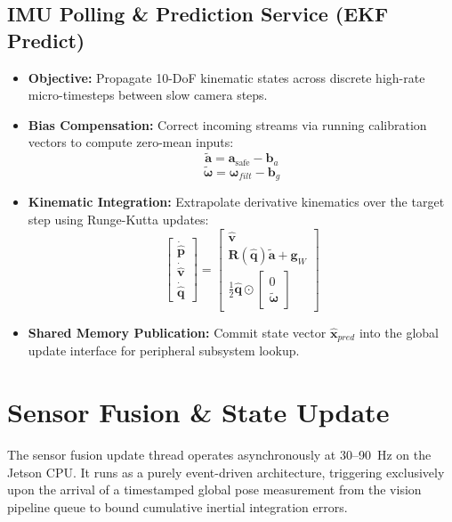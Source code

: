 \documentclass{article}
\begin{document}
\subsection{IMU Polling \& Prediction Service (EKF Predict)}
\begin{itemize}
    \item \textbf{Objective:} Propagate 10-DoF kinematic states across discrete high-rate micro-timesteps between slow camera steps.
    \item \textbf{Bias Compensation:} Correct incoming streams via running calibration vectors to compute zero-mean inputs:
    $$\tilde{\mathbf{a}} = \mathbf{a}_{\text{safe}} - \mathbf{b}_a$$
    $$\tilde{\boldsymbol{\omega}} = \boldsymbol{\omega}_{filt} - \mathbf{b}_g$$
    \item \textbf{Kinematic Integration:} Extrapolate derivative kinematics over the target step using Runge-Kutta updates:
    $$\begin{bmatrix} \dot{\hat{\mathbf{p}}} \\ \dot{\hat{\mathbf{v}}} \\ \dot{\hat{\mathbf{q}}} \end{bmatrix} = \begin{bmatrix} \hat{\mathbf{v}} \\ \mathbf{R}(\hat{\mathbf{q}})\tilde{\mathbf{a}} + \mathbf{g}_W \\ \frac{1}{2} \hat{\mathbf{q}} \odot \begin{bmatrix} 0 \\ \tilde{\boldsymbol{\omega}} \end{bmatrix} \end{bmatrix}$$
    \item \textbf{Shared Memory Publication:} Commit state vector $\hat{\mathbf{x}}_{pred}$ into the global update interface for peripheral subsystem lookup.
\end{itemize}


\section{Sensor Fusion \& State Update}
The sensor fusion update thread operates asynchronously at 30--90~Hz on the Jetson CPU. It runs as a purely event-driven architecture, triggering exclusively upon the arrival of a timestamped global pose measurement from the vision pipeline queue to bound cumulative inertial integration errors.
\end{document}
